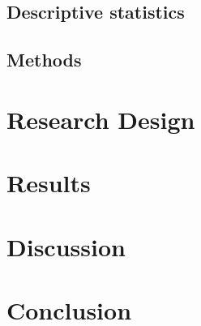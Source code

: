 \documentclass[english, grading]{tktltiki2}
\theoremstyle{definition}
\theoremstyle{remark}
\numberwithin{equation}{section} %
\begin{document}
\subsection{Descriptive statistics} \label{subsec-liter-data}


\subsection{Methods} \label{chap-liter-review-methods}


%


\section{Research Design}


\section{Results}


\section{Discussion}


\section{Conclusion}


%

%
%
%
%
\newpage






\newpage
\appendix
% 


\end{document}
